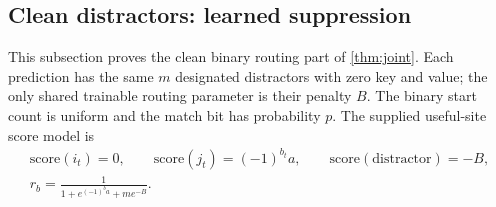 \subsection{Clean distractors: learned suppression}
\label{app:J-clean}



This subsection proves the clean binary routing part of \cref{thm:joint}. Each prediction has the same $m$ designated distractors
with zero key and value; the only shared trainable routing parameter is their penalty $B$.
The binary start count is uniform and the match bit has probability $p$.
The supplied useful-site score model is
\begin{equation}
 \begin{gathered}
 \mathrm{score}(i_t)=0,\qquad \mathrm{score}(j_t)=(-1)^{b_t}a,\qquad
 \mathrm{score}(\text{distractor})=-B,\\
 r_b=\frac{1}{1+e^{(-1)^ba}+me^{-B}}.
 \end{gathered}
 \label{eq:J-clean-scores}
\end{equation}

